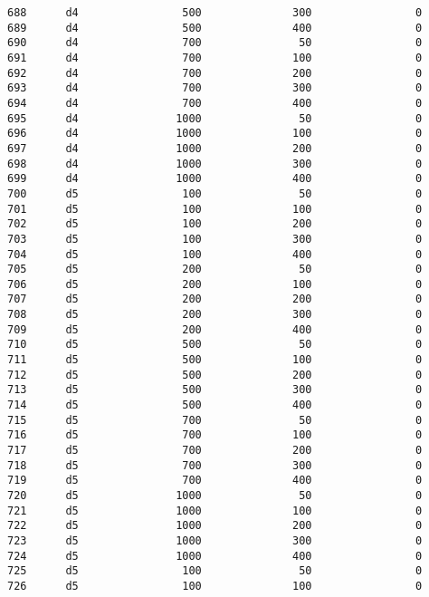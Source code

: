 \documentclass[11pt]{article}
\begin{document}
\begin{Verbatim}[commandchars=\\\{\}]
688      d4                500              300                0   
689      d4                500              400                0   
690      d4                700               50                0   
691      d4                700              100                0   
692      d4                700              200                0   
693      d4                700              300                0   
694      d4                700              400                0   
695      d4               1000               50                0   
696      d4               1000              100                0   
697      d4               1000              200                0   
698      d4               1000              300                0   
699      d4               1000              400                0   
700      d5                100               50                0   
701      d5                100              100                0   
702      d5                100              200                0   
703      d5                100              300                0   
704      d5                100              400                0   
705      d5                200               50                0   
706      d5                200              100                0   
707      d5                200              200                0   
708      d5                200              300                0   
709      d5                200              400                0   
710      d5                500               50                0   
711      d5                500              100                0   
712      d5                500              200                0   
713      d5                500              300                0   
714      d5                500              400                0   
715      d5                700               50                0   
716      d5                700              100                0   
717      d5                700              200                0   
718      d5                700              300                0   
719      d5                700              400                0   
720      d5               1000               50                0   
721      d5               1000              100                0   
722      d5               1000              200                0   
723      d5               1000              300                0   
724      d5               1000              400                0   
725      d5                100               50                0   
726      d5                100              100                0   

\end{Verbatim}
\end{document}
